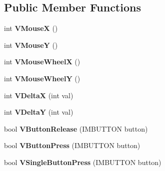 \subsection*{Public Member Functions}
\begin{DoxyCompactItemize}
\item 
\hypertarget{class_vixen_1_1_s_d_l_mouse_state_af8818ddd14ce708435de11da3c1cbf28}{}int {\bfseries V\+Mouse\+X} ()\label{class_vixen_1_1_s_d_l_mouse_state_af8818ddd14ce708435de11da3c1cbf28}

\item 
\hypertarget{class_vixen_1_1_s_d_l_mouse_state_a353c6812be91fa626ef731366d2ed596}{}int {\bfseries V\+Mouse\+Y} ()\label{class_vixen_1_1_s_d_l_mouse_state_a353c6812be91fa626ef731366d2ed596}

\item 
\hypertarget{class_vixen_1_1_s_d_l_mouse_state_a6e709026d3401835c6422f8e119cc021}{}int {\bfseries V\+Mouse\+Wheel\+X} ()\label{class_vixen_1_1_s_d_l_mouse_state_a6e709026d3401835c6422f8e119cc021}

\item 
\hypertarget{class_vixen_1_1_s_d_l_mouse_state_ae9e72e10144c6041fbbc1a00cb7486dd}{}int {\bfseries V\+Mouse\+Wheel\+Y} ()\label{class_vixen_1_1_s_d_l_mouse_state_ae9e72e10144c6041fbbc1a00cb7486dd}

\item 
\hypertarget{class_vixen_1_1_s_d_l_mouse_state_a31713daf5c8ce6cdeda65c0d87fa2f6c}{}int {\bfseries V\+Delta\+X} (int val)\label{class_vixen_1_1_s_d_l_mouse_state_a31713daf5c8ce6cdeda65c0d87fa2f6c}

\item 
\hypertarget{class_vixen_1_1_s_d_l_mouse_state_a24e1b4af3df0754a7074f0a79e32d4ef}{}int {\bfseries V\+Delta\+Y} (int val)\label{class_vixen_1_1_s_d_l_mouse_state_a24e1b4af3df0754a7074f0a79e32d4ef}

\item 
\hypertarget{class_vixen_1_1_s_d_l_mouse_state_ac319e40bedee80648e2de192931cae0c}{}bool {\bfseries V\+Button\+Release} (I\+M\+B\+U\+T\+T\+O\+N button)\label{class_vixen_1_1_s_d_l_mouse_state_ac319e40bedee80648e2de192931cae0c}

\item 
\hypertarget{class_vixen_1_1_s_d_l_mouse_state_acfaef5aac197b0ff8f62a2bb83c7719e}{}bool {\bfseries V\+Button\+Press} (I\+M\+B\+U\+T\+T\+O\+N button)\label{class_vixen_1_1_s_d_l_mouse_state_acfaef5aac197b0ff8f62a2bb83c7719e}

\item 
\hypertarget{class_vixen_1_1_s_d_l_mouse_state_a8d7aa8b35f85d3afe07ff5f98e30a1da}{}bool {\bfseries V\+Single\+Button\+Press} (I\+M\+B\+U\+T\+T\+O\+N button)\label{class_vixen_1_1_s_d_l_mouse_state_a8d7aa8b35f85d3afe07ff5f98e30a1da}


\end{DoxyCompactItemize}
